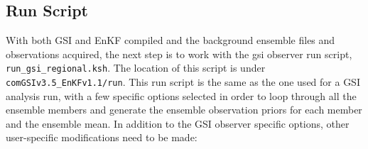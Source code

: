 \subsection{Run Script}

With both GSI and EnKF compiled and the background ensemble files and observations acquired, 
the next step is to work with the gsi observer run script, \verb|run_gsi_regional.ksh|. The location of this 
script is under \verb|comGSIv3.5_EnKFv1.1/run|. This run script is the same as the one used for 
a GSI analysis run, with a few specific options selected in order to loop through all the ensemble 
members and generate the ensemble observation priors for each member and the ensemble 
mean. In addition to the GSI observer specific options, other user-specific modifications need 
to be made:

